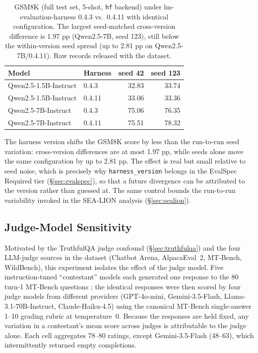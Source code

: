 \documentclass[11pt]{article}
\begin{document}
\begin{table}[ht]
\centering
\small
\begin{tabular}{llrr}
\toprule
Model & Harness & seed 42 & seed 123 \\
\midrule
Qwen2.5-1.5B-Instruct & 0.4.3  & 32.83 & 33.74 \\
Qwen2.5-1.5B-Instruct & 0.4.11 & 33.06 & 33.36 \\
Qwen2.5-7B-Instruct   & 0.4.3  & 75.06 & 76.35 \\
Qwen2.5-7B-Instruct   & 0.4.11 & 75.51 & 78.32 \\
\bottomrule
\end{tabular}
\caption{GSM8K (full test set, 5-shot, \texttt{hf} backend) under
lm-evaluation-harness 0.4.3 vs.\ 0.4.11 with identical configuration. The
largest seed-matched cross-version difference is 1.97 pp (Qwen2.5-7B, seed 123),
still below the within-version seed spread (up to 2.81 pp on Qwen2.5-7B/0.4.11).
Raw records released with the dataset.}
\label{tab:e3-harness-version}
\end{table}

The harness version shifts the GSM8K score by less than the run-to-run seed
variation: cross-version differences are at most 1.97 pp, while seeds alone move
the same configuration by up to 2.81 pp. The effect is real but small relative
to seed noise, which is precisely why \texttt{harness\_version} belongs in the
EvalSpec Required tier (\S\ref{sec:evalspec}), so that a future divergence can
be attributed to the version rather than guessed at. The same control bounds the
run-to-run variability invoked in the SEA-LION analysis (\S\ref{sec:sealion}).


\subsection{Judge-Model Sensitivity}
\label{app:exp-judge}

Motivated by the TruthfulQA judge confound (\S\ref{sec:truthfulqa}) and the four
LLM-judge sources in the dataset (Chatbot Arena, AlpacaEval~2, MT-Bench,
WildBench), this experiment isolates the effect of the judge model. Five
instruction-tuned ``contestant'' models each generated one response to the 80
turn-1 MT-Bench questions \citep{zheng2023mtbench}; the identical responses were
then scored by four judge models from different providers (GPT-4o-mini,
Gemini-3.5-Flash, Llama-3.1-70B-Instruct, Claude-Haiku-4.5) using the canonical
MT-Bench single-answer 1--10 grading rubric at temperature~0. Because the
responses are held fixed, any variation in a contestant's mean score across
judges is attributable to the judge alone. Each cell aggregates 78--80 ratings,
except Gemini-3.5-Flash (48--63), which intermittently returned empty completions.
\end{document}
